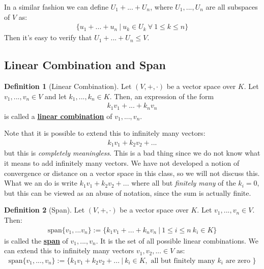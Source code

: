 \documentclass[11pt]{scrartcl}
\theoremstyle{definition}
\newtheorem{definition}{Definition}
\theoremstyle{remark}
\newcommand{\dfn}[1]{\textbf{\underline{#1}}}
\newcommand{\vsok}[0]{Let $(V, +, \cdot)$ be a vector space over $K$}
\newcommand{\vecspan}[1]{\text{span}\{ #1 \}}
\begin{document}
In a similar fashion we can define $U_1 + ... + U_n$, where $U_1, ..., U_n$ are all subspaces of $V$ as: 
\begin{align*}
		\{ u_1 + ... + u_n\ |\ u_k \in U_k\ \forall\ 1 \leq k \leq n \} 
\end{align*}
Then it's easy to verify that $U_1 + ... + U_n \leq V$. 

\subsection{Linear Combination and Span}

\begin{definition}[Linear Combination]
	\vsok. Let $v_1, ..., v_n \in V$ and let $k_1, ..., k_n \in K$. Then, an expression of the form
	\begin{align}
		k_1 v_1 + ... + k_n v_n 	
	\end{align}	
	is called a \dfn{linear combination} of $v_1, ..., v_n$. 
\end{definition}
Note that it is possible to extend this to infinitely many vectors: 
\begin{align*}
	k_1 v_1 + k_2 v_2 + ...
\end{align*}
but this is \emph{completely meaningless}. This is a bad thing since we do not know what it means to add infinitely many vectors. We have not developed a notion of convergence or distance on a vector space in this class, so we will not discuss this. What we an do is write $k_1 v_1 + k_2 v_2 + ...$ where all but \emph{finitely many} of the $k_i =0$, but this can be viewed as an abuse of notation, since the sum is actually finite. 

\begin{definition}[Span]
	\vsok. Let $v_1, ..., v_n \in V$. Then: 
	\begin{align}
		\vecspan{v_1, ...v_n} := \{ k_1 v_1 + ... + k_n v_n\ |\ 1 \leq i \leq n\ k_i \in K \} 
	\end{align}
	is called the \dfn{span} of $v_1, ..., v_n$. It is the set of all possible linear combinations. We can extend this to infinitely many vectors $v_1, v_2, ... \in V$ as: 
	\begin{align*}
		\vecspan{v_1, ..., v_n } := \{ k_1 v_1 + k_2 v_2 + ...\ |\ k_i \in K, \text{ all but finitely many $k_i$ are zero } \} 	
	\end{align*}

\end{definition}
\end{document}
